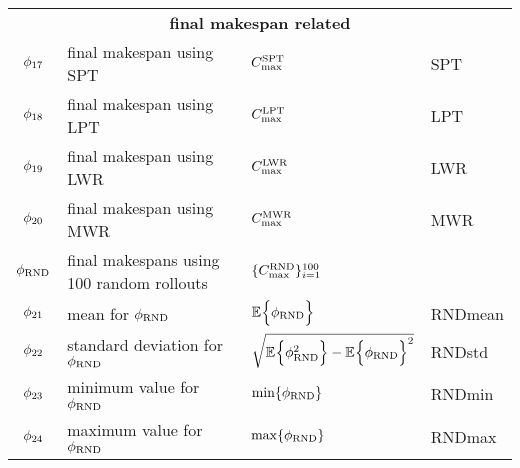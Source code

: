 {\begin{tabular}{clll}
 \midrule
 \multicolumn{4}{c}{\textbf{final makespan related}}\\
 $\phi_{17}$ & final makespan using SPT & $ C_{\max}^{\text{SPT}}$ & SPT \\
 $\phi_{18}$ & final makespan using LPT & $ C_{\max}^{\text{LPT}}$ & LPT \\
 $\phi_{19}$ & final makespan using LWR & $ C_{\max}^{\text{LWR}}$ & LWR \\
 $\phi_{20}$ & final makespan using MWR & $ C_{\max}^{\text{MWR}}$ & MWR \\
 $\phi_{\text{RND}}$ & final makespans using 100 random rollouts & $ 
 \{C_{\max}^{\text{RND}}\}_{i=1}^{100}$ & \\ 
 $\phi_{21}$ & mean for $\phi_{\text{RND}}$ & ${\mathbb E}_{ }\Big\{\phi_{\text{RND}}\Big\}$ & RNDmean \\ 
 $\phi_{22}$ & standard deviation for $\phi_{\text{RND}}$ & 
 $\sqrt{{\mathbb E}_{ }\Big\{\phi_{\text{RND}}^2\Big\}-{\mathbb E}_{ }\Big\{\phi_{\text{RND}}\Big\}^2}$ & RNDstd \\
 $\phi_{23}$ & minimum value for $\phi_{\text{RND}}$ & $\min\{\phi_{\text{RND}}\}$ & RNDmin \\ 
 $\phi_{24}$ & maximum value for $\phi_{\text{RND}}$ & $\max\{\phi_{\text{RND}}\}$ & RNDmax \\ 
 \bottomrule
 \end{tabular}
}
